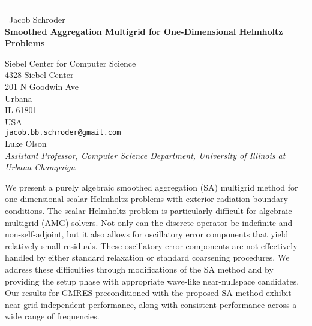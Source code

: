 \documentclass{report}
\begin{document}
\begin{center}
\rule{6in}{1pt} \
{\large Jacob Schroder \\
{\bf Smoothed Aggregation Multigrid for One-Dimensional Helmholtz Problems }}

Siebel Center for Computer Science \\ 4328 Siebel Center \\ 201 N Goodwin Ave \\ Urbana \\ IL 61801 \\ USA
\\
{\tt jacob.bb.schroder@gmail.com}\\
Luke Olson\\
{\em Assistant Professor, Computer Science Department, University of Illinois at Urbana-Champaign}\end{center}

We present a purely algebraic smoothed aggregation (SA) multigrid method
for one-dimensional scalar Helmholtz problems with exterior radiation
boundary conditions. The scalar Helmholtz problem is particularly
difficult for algebraic multigrid (AMG) solvers. Not only can the
discrete operator be indefinite and non-self-adjoint, but it also allows
for oscillatory error components that yield relatively small residuals.
These oscillatory error components are not effectively handled by either
standard relaxation or standard coarsening procedures. We address these
difficulties through modifications of the SA method and by providing the
setup phase with appropriate wave-like near-nullspace candidates. Our
results for GMRES preconditioned with the proposed SA method exhibit near
grid-independent performance, along with consistent performance across a
wide range of frequencies.
\end{document}
